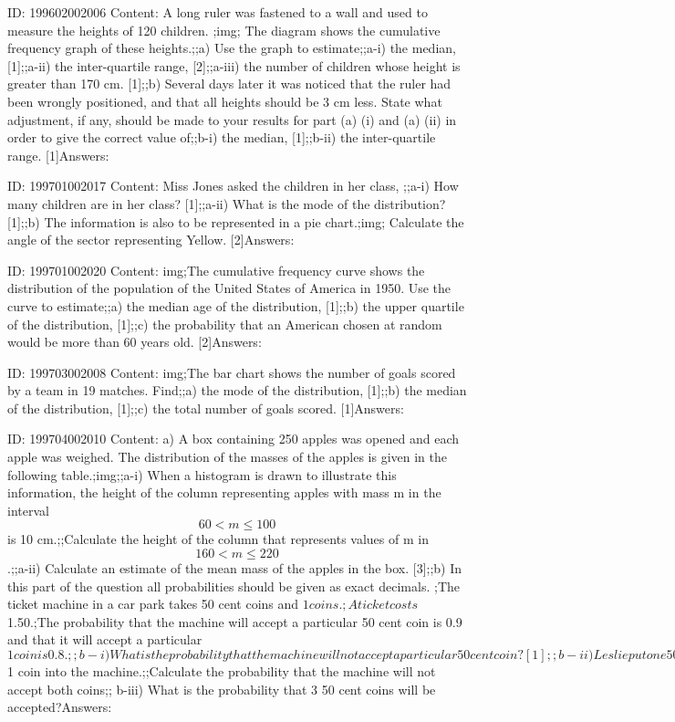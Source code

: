\documentclass{article}
\begin{document}
ID: 199602002006
Content:
A long ruler was fastened to a wall and used to measure the heights of 120 children. ;img; The diagram shows the cumulative frequency graph of these heights.;;a) Use the graph to estimate;;a-i) the median, [1];;a-ii)  the inter-quartile range, [2];;a-iii) the number of children whose height is greater than 170 cm. [1];;b) Several days later it was noticed that the ruler had been wrongly positioned, and that all heights should be 3 cm less. State what adjustment, if any, should be made to your results for part (a) (i) and (a) (ii) in order to give the correct value of;;b-i) the median, [1];;b-ii) the inter-quartile range. [1]Answers:

ID: 199701002017
Content:
Miss Jones asked the children in her class, ;;a-i) How many children are in her class? [1];;a-ii) What is the mode of the distribution? [1];;b) The information is also to be represented in a pie chart.;img; Calculate the angle of the sector representing Yellow. [2]Answers:

ID: 199701002020
Content:
img;The cumulative frequency curve shows the distribution of the population of the United States of America in 1950. Use the curve to estimate;;a) the median age of the distribution, [1];;b) the upper quartile of the distribution, [1];;c) the probability that an American chosen at random would be more than 60 years old. [2]Answers:

ID: 199703002008
Content:
img;The bar chart shows the number of goals scored by a team in 19 matches. Find;;a) the mode of the distribution, [1];;b) the median of the distribution, [1];;c) the total number of goals scored. [1]Answers:

ID: 199704002010
Content:
a) A box containing 250 apples was opened and each apple was weighed. The distribution of the masses of the apples is given in the following table.;img;;a-i) When a histogram is drawn to illustrate this information, the height of the column representing apples with mass m in the interval $$60 < m \leq 100$$ is 10 cm.;;Calculate the height of the column that represents values of m in $$160 < m \leq 220$$.;;a-ii) Calculate an estimate of the mean mass of the apples in the box. [3];;b) In this part of the question all probabilities should be given as exact decimals. ;The ticket machine in a car park takes 50 cent coins and $1 coins. ;A ticket costs $1.50.;The probability that the machine will accept a particular 50 cent coin is 0.9 and that it will accept a particular $1 coin is 0.8.;;b-i) What is the probability that the machine will not accept a particular 50 cent coin? [1];;b-ii) Leslie put one 50 cent coin and one $1 coin into the machine.;;Calculate the probability that the machine will not accept both coins;; b-iii) What is the probability that 3 50 cent coins will be accepted?Answers:
\end{document}
